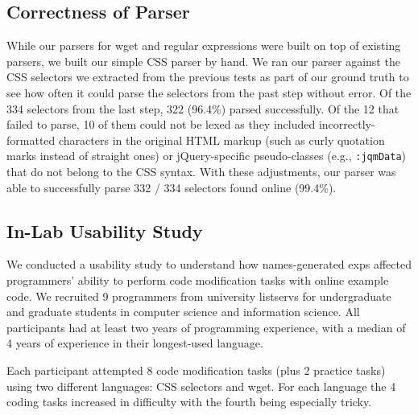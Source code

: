 \fi
%
\begin{changes}
\subsection{Correctness of Parser}

While our parsers for wget and regular expressions were built on top of existing parsers, we built our simple CSS parser by hand.
We ran our parser against the CSS selectors we extracted from the previous tests as part of our ground truth to see how often it could parse the selectors from the past step without error.
Of the 334 selectors from the last step, 322 (96.4\%) parsed successfully.
Of the 12 that failed to parse, 10 of them could not be lexed as they included incorrectly-formatted characters in the original HTML markup (such as curly quotation marks instead of straight ones) or jQuery-specific pseudo-classes (e.g., \texttt{:jqmData}) that do not belong to the CSS syntax.
With these adjustments, our parser was able to successfully parse 332 / 334 selectors found online (99.4\%).

\end{changes}

\subsection{In-Lab Usability Study}

We conducted a usability study to understand how \Glspl{name}-generated \glspl{exp} affected programmers' ability to perform code modification tasks with online example code.
We recruited 9 programmers from university listservs for undergraduate and graduate students in computer science and information science.
All participants had at least two years of programming experience, with a median of 4 years of experience in their longest-used language.

Each participant attempted 8 code modification tasks (plus 2 practice tasks) using two different languages: CSS selectors and wget.
For each language the 4 coding tasks increased in difficulty with the fourth being especially tricky.

